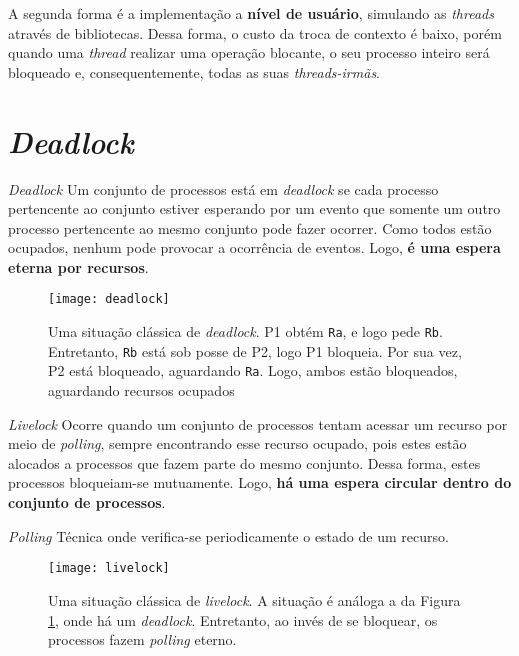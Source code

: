 A segunda forma é a implementação a \textbf{nível de usuário}, simulando as \textit{threads} através de bibliotecas. Dessa forma, o custo da troca de contexto é baixo, porém quando uma \textit{thread} realizar uma operação blocante, o seu processo inteiro será bloqueado e, consequentemente, todas as suas \textit{threads-irmãs}.







\section{\textit{Deadlock}}
\begin{definicao}{\textit{Deadlock}}
  Um conjunto de processos está em \textit{deadlock} se cada processo pertencente ao conjunto estiver esperando por um evento que somente um outro processo pertencente ao mesmo conjunto pode fazer ocorrer. Como todos estão ocupados, nenhum pode provocar a ocorrência de eventos. Logo, \textbf{é uma espera eterna por recursos}.
\end{definicao}

\begin{figure}[ht]
  \centering
  \texttt{[image: deadlock]}
  \caption{Uma situação clássica de \textit{deadlock}. P1 obtém \texttt{Ra}, e logo pede \texttt{Rb}. Entretanto, \texttt{Rb} está sob posse de P2, logo P1 bloqueia. Por sua vez, P2 está bloqueado, aguardando \texttt{Ra}. Logo, ambos estão bloqueados, aguardando recursos ocupados}
  \label{fig:deadlock}
\end{figure}

\begin{definicao}{\textit{Livelock}}
  Ocorre quando um conjunto de processos tentam acessar um recurso por meio de \textit{polling}, sempre encontrando esse recurso ocupado, pois estes estão alocados a processos que fazem parte do mesmo conjunto. Dessa forma, estes processos bloqueiam-se mutuamente. Logo, \textbf{há uma espera circular dentro do conjunto de processos}.
\end{definicao}

\begin{definicao}{\textit{Polling}}
  Técnica onde verifica-se periodicamente o estado de um recurso.
\end{definicao}

\begin{figure}[ht]
  \centering
  \texttt{[image: livelock]}
  \caption{Uma situação clássica de \textit{livelock}. A situação é análoga a da Figura \ref{fig:deadlock}, onde há um \textit{deadlock}. Entretanto, ao invés de se bloquear, os processos fazem \textit{polling} eterno.}
  \label{fig:livelock}
\end{figure}

